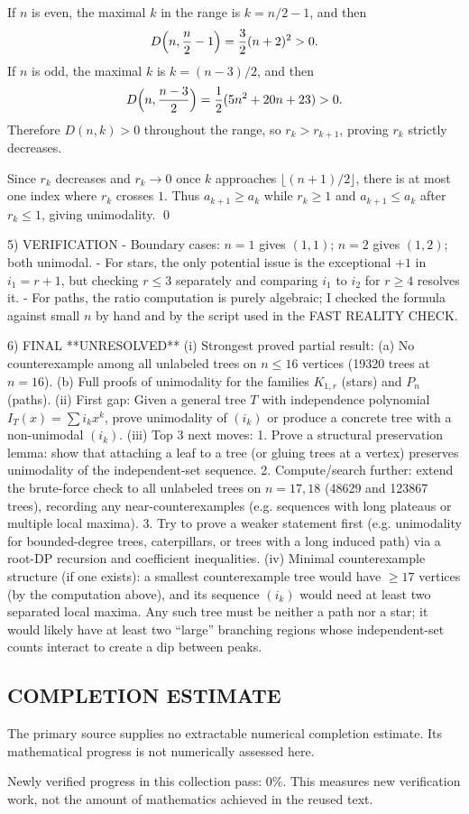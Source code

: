 If $n$ is even, the maximal $k$ in the range is $k=n/2-1$, and then
\[
 D\Bigl(n,\frac{n}{2}-1\Bigr)=\frac{3}{2}(n+2)^2>0.
\]
If $n$ is odd, the maximal $k$ is $k=(n-3)/2$, and then
\[
 D\Bigl(n,\frac{n-3}{2}\Bigr)=\frac{1}{2}(5n^2+20n+23)>0.
\]
Therefore $D(n,k)>0$ throughout the range, so $r_k>r_{k+1}$, proving $r_k$ strictly decreases.

Since $r_k$ decreases and $r_k\to 0$ once $k$ approaches $\lfloor (n+1)/2\rfloor$, there is at most one index where $r_k$ crosses $1$.  Thus $a_{k+1}\ge a_k$ while $r_k\ge 1$ and $a_{k+1}\le a_k$ after $r_k\le 1$, giving unimodality.  \qed

5) VERIFICATION
- Boundary cases: $n=1$ gives $(1,1)$; $n=2$ gives $(1,2)$; both unimodal.
- For stars, the only potential issue is the exceptional $+1$ in $i_1=r+1$, but checking $r\le 3$ separately and comparing $i_1$ to $i_2$ for $r\ge 4$ resolves it.
- For paths, the ratio computation is purely algebraic; I checked the formula against small $n$ by hand and by the script used in the FAST REALITY CHECK.

6) FINAL
**UNRESOLVED**
(i) Strongest proved partial result: (a) No counterexample among all unlabeled trees on $n\le 16$ vertices (19320 trees at $n=16$). (b) Full proofs of unimodality for the families $K_{1,r}$ (stars) and $P_n$ (paths).
(ii) First gap: Given a general tree $T$ with independence polynomial $I_T(x)=\sum i_k x^k$, prove unimodality of $(i_k)$ or produce a concrete tree with a non-unimodal $(i_k)$.
(iii) Top 3 next moves:
  1. Prove a structural preservation lemma: show that attaching a leaf to a tree (or gluing trees at a vertex) preserves unimodality of the independent-set sequence.
  2. Compute/search further: extend the brute-force check to all unlabeled trees on $n=17,18$ (48629 and 123867 trees), recording any near-counterexamples (e.g. sequences with long plateaus or multiple local maxima).
  3. Try to prove a weaker statement first (e.g. unimodality for bounded-degree trees, caterpillars, or trees with a long induced path) via a root-DP recursion and coefficient inequalities.
(iv) Minimal counterexample structure (if one exists): a smallest counterexample tree would have $\ge 17$ vertices (by the computation above), and its sequence $(i_k)$ would need at least two separated local maxima.  Any such tree must be neither a path nor a star; it would likely have at least two ``large'' branching regions whose independent-set counts interact to create a dip between peaks.




\subsection*{COMPLETION ESTIMATE}
The primary source supplies no extractable numerical completion estimate. Its mathematical progress is not numerically assessed here.

Newly verified progress in this collection pass: $0\%$. This measures new verification work, not the amount of mathematics achieved in the reused text.
